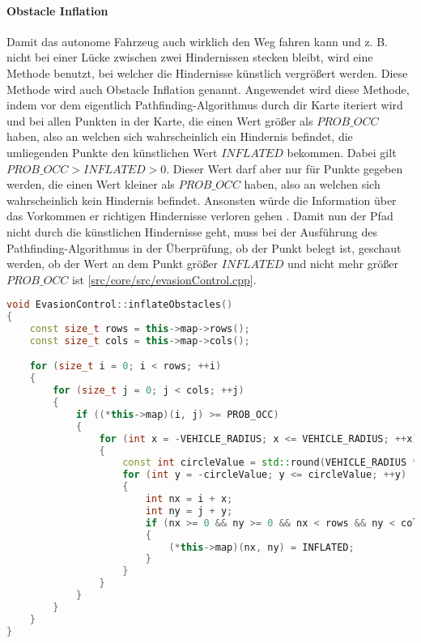 \paragraph{Obstacle Inflation} \mbox{}

Damit das autonome Fahrzeug auch wirklich den Weg fahren kann und z. B. nicht bei einer Lücke zwischen zwei Hindernissen stecken bleibt, 
wird eine Methode benutzt, bei welcher die Hindernisse künstlich vergrößert werden. Diese Methode wird auch Obstacle Inflation genannt. 
Angewendet wird diese Methode, indem vor dem eigentlich Pathfinding-Algorithmus durch dir Karte iteriert wird und bei allen Punkten in der Karte, 
die einen Wert größer als \(PROB\_OCC\) haben, also an welchen sich wahrscheinlich ein Hindernis befindet, 
die umliegenden Punkte den künstlichen Wert \(INFLATED\) bekommen. Dabei gilt \(PROB\_OCC > INFLATED > 0\). 
Dieser Wert darf aber nur für Punkte gegeben werden, die einen Wert kleiner als \(PROB\_OCC\) haben, also an welchen sich wahrscheinlich kein Hindernis befindet. 
Ansonsten würde die Information über das Vorkommen er richtigen Hindernisse verloren gehen \cite{fernandesOrientationEnhancedAstar2015}. 
Damit nun der Pfad nicht durch die künstlichen Hindernisse geht, muss bei der Ausführung des Pathfinding-Algorithmus in der Überprüfung, 
ob der Punkt belegt ist, geschaut werden, ob der Wert an dem Punkt größer \(INFLATED\) und nicht mehr größer \(PROB\_OCC\) ist 
[\href{https://github.com/Jundy0/Studienarbeit/blob/main/src/core/src/evasionControl.cpp}{src/core/src/evasionControl.cpp}]. 

\begin{lstlisting}[caption={Obstacles Inflation},label={lst:inflateObstacles},language={C++}]
void EvasionControl::inflateObstacles()
{
    const size_t rows = this->map->rows();
    const size_t cols = this->map->cols();

    for (size_t i = 0; i < rows; ++i)
    {
        for (size_t j = 0; j < cols; ++j)
        {
            if ((*this->map)(i, j) >= PROB_OCC)
            {
                for (int x = -VEHICLE_RADIUS; x <= VEHICLE_RADIUS; ++x)
                {
                    const int circleValue = std::round(VEHICLE_RADIUS * std::cos(std::abs(x) * M_PI / (2 * VEHICLE_RADIUS)));
                    for (int y = -circleValue; y <= circleValue; ++y)
                    {
                        int nx = i + x;
                        int ny = j + y;
                        if (nx >= 0 && ny >= 0 && nx < rows && ny < cols && (*this->map)(nx, ny) < PROB_OCC)
                        {
                            (*this->map)(nx, ny) = INFLATED;
                        }
                    }
                }
            }
        }
    }
}
\end{lstlisting}

